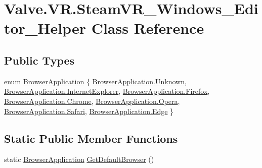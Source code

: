 \hypertarget{class_valve_1_1_v_r_1_1_steam_v_r___windows___editor___helper}{}\section{Valve.\+V\+R.\+Steam\+V\+R\+\_\+\+Windows\+\_\+\+Editor\+\_\+\+Helper Class Reference}
\label{class_valve_1_1_v_r_1_1_steam_v_r___windows___editor___helper}
\subsection*{Public Types}
\begin{DoxyCompactItemize}
\item 
enum \mbox{\hyperlink{class_valve_1_1_v_r_1_1_steam_v_r___windows___editor___helper_adfefbc734f0accaba87a104ad1a88715}{Browser\+Application}} \{ \newline
\mbox{\hyperlink{class_valve_1_1_v_r_1_1_steam_v_r___windows___editor___helper_adfefbc734f0accaba87a104ad1a88715a88183b946cc5f0e8c96b2e66e1c74a7e}{Browser\+Application.\+Unknown}}, 
\mbox{\hyperlink{class_valve_1_1_v_r_1_1_steam_v_r___windows___editor___helper_adfefbc734f0accaba87a104ad1a88715a814f634f30eaaa5a7d875005ddd33685}{Browser\+Application.\+Internet\+Explorer}}, 
\mbox{\hyperlink{class_valve_1_1_v_r_1_1_steam_v_r___windows___editor___helper_adfefbc734f0accaba87a104ad1a88715a763f7f1aec350cd1a46238d1d5c3c229}{Browser\+Application.\+Firefox}}, 
\mbox{\hyperlink{class_valve_1_1_v_r_1_1_steam_v_r___windows___editor___helper_adfefbc734f0accaba87a104ad1a88715a986c37480b1f1c2e443504b38b6361b4}{Browser\+Application.\+Chrome}}, 
\newline
\mbox{\hyperlink{class_valve_1_1_v_r_1_1_steam_v_r___windows___editor___helper_adfefbc734f0accaba87a104ad1a88715aa956e985535b8d57732d14dfa0e4c71a}{Browser\+Application.\+Opera}}, 
\mbox{\hyperlink{class_valve_1_1_v_r_1_1_steam_v_r___windows___editor___helper_adfefbc734f0accaba87a104ad1a88715a50de9bc68c93dc32d8c7c90593471760}{Browser\+Application.\+Safari}}, 
\mbox{\hyperlink{class_valve_1_1_v_r_1_1_steam_v_r___windows___editor___helper_adfefbc734f0accaba87a104ad1a88715ae4a297a0f76119a442c2595ac040673e}{Browser\+Application.\+Edge}}
 \}
\end{DoxyCompactItemize}
\subsection*{Static Public Member Functions}
\begin{DoxyCompactItemize}
\item 
static \mbox{\hyperlink{class_valve_1_1_v_r_1_1_steam_v_r___windows___editor___helper_adfefbc734f0accaba87a104ad1a88715}{Browser\+Application}} \mbox{\hyperlink{class_valve_1_1_v_r_1_1_steam_v_r___windows___editor___helper_a2650867238c41bf1f479e04fba77be41}{Get\+Default\+Browser}} ()
\end{DoxyCompactItemize}


